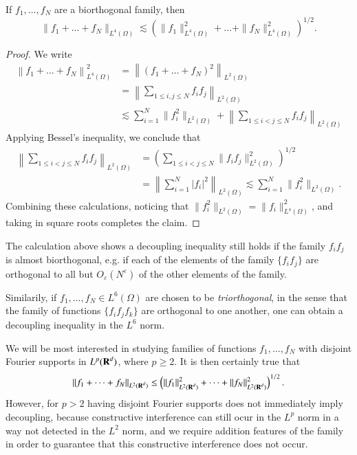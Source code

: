 \begin{theorem}
  If $f_1, \dots, f_N$ are a biorthogonal family, then
  \[ \| f_1 + \dots + f_N \|_{L^4(\Omega)} \lesssim \left( \| f_1 \|_{L^4(\Omega)}^2 + \dots + \| f_N \|_{L^4(\Omega)}^2 \right)^{1/2}. \]
\end{theorem}
\begin{proof}
  We write
  \begin{align*}
    \left\| f_1 + \dots + f_N \right\|_{L^4(\Omega)}^2 &= \left\| (f_1 + \dots + f_N)^2 \right\|_{L^2(\Omega)}\\
    &= \left\| \sum_{1 \leq i,j \leq N} f_i f_j \right\|_{L^2(\Omega)}\\
    &\lesssim \sum_{i = 1}^N \| f_i^2 \|_{L^2(\Omega)} + \left\| \sum_{1 \leq i < j \leq N} f_i f_j \right\|_{L^2(\Omega)}
  \end{align*}
  Applying Bessel's inequality, we conclude that
  \begin{align*}
    \left\| \sum_{1 \leq i < j \leq N} f_i f_j \right\|_{L^2(\Omega)} &= \left( \sum_{1 \leq i < j \leq N} \| f_i f_j \|_{L^2(\Omega)}^2 \right)^{1/2}\\
    &= \left\| \sum_{i = 1}^N |f_i|^2 \right\|_{L^2(\Omega)} \lesssim \sum_{i = 1}^N \| f_i^2 \|_{L^2(\Omega)}.
  \end{align*}
  Combining these calculations, noticing that $\| f_i^2 \|_{L^2(\Omega)} = \| f_i \|_{L^4(\Omega)}^2$, and taking in square roots completes the claim.
\end{proof}

\begin{remark}
  The calculation above shows a decoupling inequality still holds if the family $f_i f_j$ is almost biorthogonal, e.g. if each of the elements of the family $\{ f_i f_j \}$ are orthogonal to all but $O_\varepsilon(N^\varepsilon)$ of the other elements of the family.
\end{remark}

\begin{remark}
  Similarily, if $f_1, \dots, f_N \in L^6(\Omega)$ are chosen to be \emph{triorthogonal}, in the sense that the family of functions $\{ f_i f_j f_k \}$ are orthogonal to one another, one can obtain a decoupling inequality in the $L^6$ norm.
\end{remark}

We will be most interested in studying families of functions $f_1, \dots, f_N$ with disjoint Fourier supports in $L^p(\operatorname{\mathbf{R}}^d)$, where $p \geq 2$. It is then certainly true that
%
\[ \| f_1 + \dots + f_N \|_{L^2(\operatorname{\mathbf{R}}^d)} \leq \left( \| f_1 \|_{L^2(\operatorname{\mathbf{R}}^d)}^2 + \dots + \| f_N \|_{L^2(\operatorname{\mathbf{R}}^d)}^2 \right)^{1/2}. \]
%
However, for $p > 2$ having disjoint Fourier supports does not immediately imply decoupling, because constructive interference can still ocur in the $L^p$ norm in a way not detected in the $L^2$ norm, and we require addition features of the family in order to guarantee that this constructive interference does not occur.

